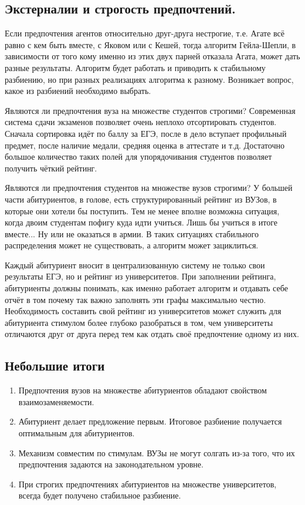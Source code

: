 \documentclass[pdftex, 11pt, a4paper]{article}
\begin{document}
\subsection*{Экстерналии и строгость предпочтений.} 

Если предпочтения агентов относительно друг-друга нестрогие, т.е. Агате всё равно с кем быть вместе, с Яковом или с Кешей, тогда алгоритм Гейла-Шепли, в зависимости от того кому именно из этих двух парней отказала Агата, может дать разные результаты. Алгоритм будет работать и приводить к стабильному разбиению, но при разных реализациях алгоритма к разному. Возникает вопрос, какое из разбиений необходимо выбрать.  

Являются ли предпочтения вуза на множестве студентов строгими? Современная система сдачи экзаменов позволяет очень неплохо отсортировать студентов. Сначала сортировка идёт по баллу за ЕГЭ, после в дело вступает профильный предмет, после наличие медали, средняя оценка в аттестате и т.д. Достаточно большое количество таких полей для упорядочивания студентов позволяет получить чёткий рейтинг. 

Являются ли предпочтения студентов на множестве вузов строгими? У большей части абитуриентов, в голове, есть структурированный рейтинг из ВУЗов, в которые они хотели бы поступить.  Тем не менее вполне возможна ситуация, когда двоим студентам пофигу куда идти учиться. Лишь бы учиться в итоге вместе... Ну или не оказаться в армии. В таких ситуациях стабильного распределения может не существовать, а алгоритм может зациклиться.

Каждый абитуриент вносит в централизованную систему не только свои результаты ЕГЭ, но и рейтинг из университетов. При заполнении рейтинга, абитуриенты должны понимать, как именно работает алгоритм и отдавать себе отчёт в том почему так важно заполнять эти графы максимально честно. Необходимость составить свой рейтинг из университетов может служить для абитуриента стимулом более глубоко разобраться в том, чем университеты отличаются друг от друга перед тем как отдать своё предпочтение одному из них. 

\subsection*{Небольшие итоги}

\begin{enumerate}
\item Предпочтения вузов на множестве абитуриентов обладают свойством взаимозаменяемости. 

\item Абитуриент делает предложение первым. Итоговое разбиение получается оптимальным для абитуриентов. 

\item Механизм совместим по стимулам. ВУЗы не могут солгать из-за того, что их предпочтения задаются на законодательном уровне.  

\item При строгих предпочтениях абитуриентов на множестве университетов, всегда будет получено стабильное разбиение. 

\end{enumerate} 
\end{document}
